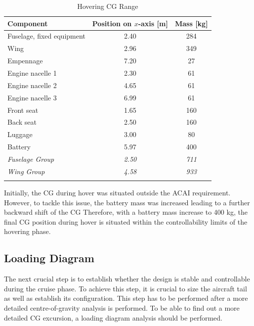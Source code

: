 \begin{table}[H]
    \centering
    \caption{Hovering CG Range}
    \label{tab:CG_hover}
    \begin{tabular}{l|S[table-format=1.2]S[table-format=4]}
        \toprule
        \textbf{Component}                 & \textbf{Position on $x$-axis } {[}m{]} & \textbf{Mass } {[}kg{]} \\
        \midrule
        Fuselage, fixed equipment & 2.40                       & 284           \\
        Wing                      & 2.96                       & 349           \\
        Empennage                 & 7.20                       & 27            \\
        Engine nacelle 1          & 2.30                       & 61            \\
        Engine nacelle 2          & 4.65                       & 61            \\
        Engine nacelle 3          & 6.99                       & 61            \\
        Front seat                & 1.65                       & 160           \\
        Back seat                 & 2.50                       & 160           \\
        Luggage                   & 3.00                       & 80            \\
        Battery                   & 5.97                       & 400           \\
        \midrule
        \textit{Fuselage Group}   & \textit{2.50}              & \textit{711}  \\
        \textit{Wing Group}       & \textit{4.58}              & \textit{933}  \\
                    &               &  \\
        \bottomrule
    \end{tabular}
\end{table}

Initially, the CG during hover was situated outside the ACAI requirement.
However, to tackle this issue, the battery mass was increased leading to a further backward shift of the CG
Therefore, with a battery mass increase to 400 kg, the final CG position during hover is situated within the controllability limits of the hovering phase.

\subsection{Loading Diagram}
 The next crucial step is to establish whether the design is stable and controllable during the cruise phase.
 To achieve this step, it is crucial to size the aircraft tail as well as establish its configuration.
 This step has to be performed after a more detailed centre-of-gravity analysis is performed.
 To be able to find out a more detailed CG excursion, a loading diagram analysis should be performed.

